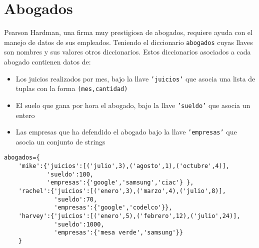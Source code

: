 \section{Abogados}

Pearson Hardman, una firma muy prestigiosa de abogados, requiere ayuda con el manejo de datos de sus empleados. Teniendo el diccionario \texttt{abogados} cuyas llaves son nombres y sus valores otros diccionarios. Estos diccionarios asociados a cada abogado contienen datos de:
\begin{itemize}
    \item Los juicios realizados por mes, bajo la llave \texttt{'juicios'} que asocia una lista de tuplas con la forma \texttt{(mes,cantidad)}
    \item El suelo que gana por hora el abogado, bajo la llave \texttt{'sueldo'} que asocia un entero
    \item Las empresas que ha defendido el abogado bajo la llave \texttt{'empresas'} que asocia un conjunto de strings
\end{itemize}

\begin{lstlisting}[style=consola]
abogados={
    'mike':{'juicios':[('julio',3),('agosto',1),('octubre',4)],
            'sueldo':100,
            'empresas':{'google','samsung','ciac'} },
    'rachel':{'juicios':[('enero',3),('marzo',4),('julio',8)],
              'sueldo':70,
              'empresas':{'google','codelco'}},
    'harvey':{'juicios':[('enero',5),('febrero',12),('julio',24)],
              'sueldo':1000,
              'empresas':{'mesa verde','samsung'}}
    }
\end{lstlisting}


